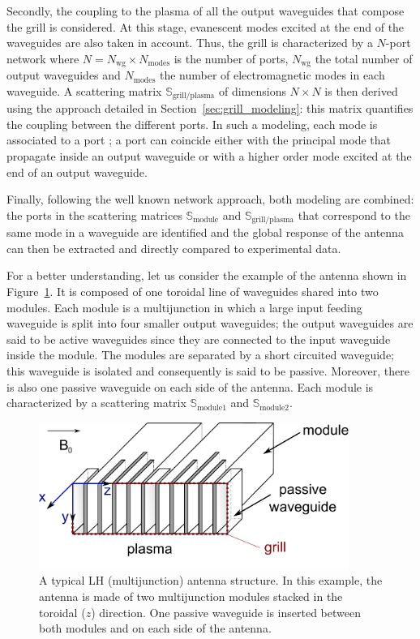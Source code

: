 Secondly, the coupling to the plasma of all the output waveguides that compose the grill is considered. At this stage, evanescent modes excited at the end of the waveguides are also taken in account. Thus, the grill is characterized by a $N$-port network where $N=N_{\mbox{wg}}\times N_{\mbox{modes}}$ is the number of ports, $N_{\mbox{wg}}$ the total number of output waveguides and $N_{\mbox{modes}}$ the number of electromagnetic modes in each waveguide. A scattering matrix $\mathbb{S}_{\mbox{grill/plasma}}$ of dimensions $N\times N$ is then derived using the approach detailed in Section~\ref{sec:grill_modeling}: this matrix quantifies the coupling between the different ports. In such a modeling, each mode is associated to a port \cite{Harrington2001}; a port can coincide either with the principal mode that propagate inside an output waveguide or with a higher order mode excited at the end of an output waveguide. 

Finally, following the well known network approach, both modeling are combined: the ports in the scattering matrices $\mathbb{S}_{\mbox{module}}$ and $\mathbb{S}_{\mbox{grill/plasma}}$ that correspond to the same mode in a waveguide are identified and the global response of the antenna can then be extracted and directly compared to experimental data.

For a better understanding, let us consider the example of the antenna shown in Figure~\ref{fig:geometry_antenna}. It is composed of one toroidal line of waveguides shared into two modules. Each module is a multijunction in which a large input feeding waveguide is split into four smaller output waveguides; the output waveguides are said to be active waveguides since they are connected to the input waveguide inside the module. The modules are separated by a short circuited waveguide; this waveguide is isolated and consequently is said to be passive. Moreover, there is also one passive waveguide on each side of the antenna. Each module is characterized by a scattering matrix $\mathbb{S}_{\mbox{module1}}$ and $\mathbb{S}_{\mbox{module2}}$.

%
\begin{figure}[h]
	\centering{}\includegraphics[width=0.9\textwidth]{figures/chap2/ALOHA/figure1} 
	\caption{A typical LH (multijunction) antenna structure. In this example, the
		antenna is made of two multijunction modules stacked in the toroidal
		($z$) direction. One passive waveguide is inserted between both modules
		and on each side of the antenna.\label{fig:geometry_antenna} }
	
\end{figure}


